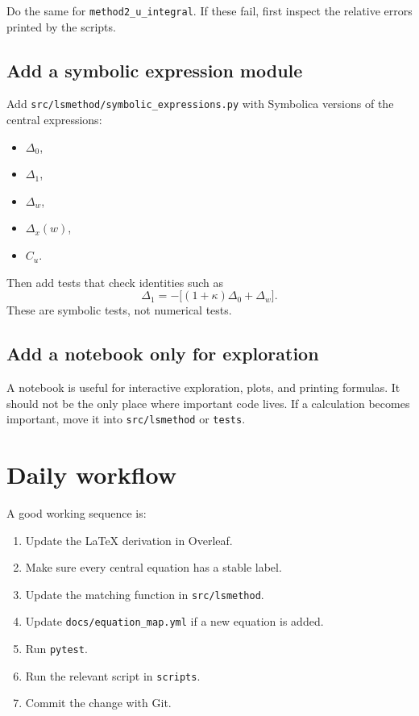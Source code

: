 \documentclass[11pt,a4paper]{article}
\begin{document}
Do the same for \texttt{method2\_u\_integral}. If these fail, first inspect the relative errors printed by the scripts.

\subsection{Add a symbolic expression module}

Add \texttt{src/lsmethod/symbolic\_expressions.py} with Symbolica versions of the central expressions:
\begin{itemize}
  \item \(\Delta_0\),
  \item \(\Delta_1\),
  \item \(\Delta_w\),
  \item \(\Delta_x(w)\),
  \item \(C_u\).
\end{itemize}

Then add tests that check identities such as
\begin{equation}
  \Delta_1 = -\bigl[(1+\kappa)\Delta_0+\Delta_w\bigr].
\end{equation}
These are symbolic tests, not numerical tests.

\subsection{Add a notebook only for exploration}

A notebook is useful for interactive exploration, plots, and printing formulas. It should not be the only place where important code lives. If a calculation becomes important, move it into \texttt{src/lsmethod} or \texttt{tests}.

\section{Daily workflow}

A good working sequence is:
\begin{enumerate}
  \item Update the LaTeX derivation in Overleaf.
  \item Make sure every central equation has a stable label.
  \item Update the matching function in \texttt{src/lsmethod}.
  \item Update \texttt{docs/equation\_map.yml} if a new equation is added.
  \item Run \texttt{pytest}.
  \item Run the relevant script in \texttt{scripts}.
  \item Commit the change with Git.
\end{enumerate}
\end{document}
